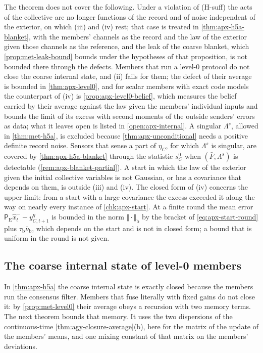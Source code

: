 The theorem does not cover the following. Under a violation of (H-suff) the acts of the collective are no longer functions of the record and of noise independent of the exterior, on which (iii) and (iv) rest; that case is treated in \cref{thm:apx-h5a-blanket}, with the members' channels as the record and the law of the exterior given those channels as the reference, and the leak of the coarse blanket, which \cref{prop:met-leak-bound} bounds under the hypotheses of that proposition, is not bounded there through the defects. Members that run a level-0 protocol do not close the coarse internal state, and (ii) fails for them; the defect of their average is bounded in \cref{thm:apx-level0}, and for scalar members with exact code models the counterpart of (iv) is \cref{prop:apx-level0-belief}, which measures the belief carried by their average against the law given the members' individual inputs and bounds the limit of its excess with second moments of the outside senders' errors as data; what it leaves open is listed in \cref{open:apx-internal}. A singular $\Lambda^s$, allowed in \cref{thm:met-h5a}, is excluded because \cref{thm:apx-unconditional} needs a positive definite record noise. Sensors that sense a part of $\eta_C$, for which $\Lambda^s$ is singular, are covered by \cref{thm:apx-h5a-blanket} through the statistic $s^0_C$ when $(\bar F,\Lambda^s)$ is detectable (\cref{rem:apx-blanket-partial}). A start in which the law of the exterior given the initial collective variables is not Gaussian, or has a covariance that depends on them, is outside (iii) and (iv). The closed form of (iv) concerns the upper limit: from a start with a large covariance the excess exceeded it along the way on nearly every instance of \cref{chk:apx-start}. At a finite round the mean error $\mathsf P_{\mathrm E}\hat x^-_t-y^\eta_{C,t+1}$ is bounded in the norm $\Vert\cdot\Vert_{\mathrm b}$ by the bracket of \eqref{eq:apx-start-round} plus $\tau_{\mathrm b}\bar\nu_{\mathrm b}$, which depends on the start and is not in closed form; a bound that is uniform in the round is not given.

\subsection{The coarse internal state of level-0 members}\label{sec:apx-level0}

In \cref{thm:apx-h5a} the coarse internal state is exactly closed because the members run the consensus filter. Members that fuse literally with fixed gains do not close it: by \cref{prop:met-level0} their average obeys a recursion with two memory terms. The next theorem bounds that memory. It uses the two dispersions of the continuous-time \cref{thm:agy-closure-average}(b), here for the matrix of the update of the members' means, and one mixing constant of that matrix on the members' deviations.

